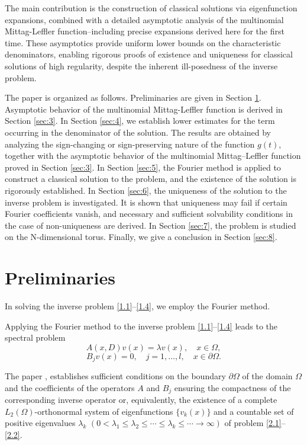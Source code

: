 \documentclass[12pt, reqno]{amsart}
\theoremstyle{definition}
\theoremstyle{remark}
\numberwithin{equation}{section}
\begin{document}
The main contribution is the construction of classical solutions via eigenfunction expansions, combined with a detailed asymptotic analysis of the multinomial Mittag-Leffler function--including precise expansions derived here for the first time. These asymptotics provide uniform lower bounds on the characteristic denominators, enabling rigorous proofs of existence and uniqueness for classical solutions of high regularity, despite the inherent ill-posedness of the inverse problem.

The paper is organized as follows. Preliminaries are given in Section \ref{sec:2}. Asymptotic behavior of the multinomial Mittag-Leffler function is derived in Section \ref{sec:3}. In Section \ref{sec:4}, we establish lower estimates for the term occurring in the denominator of the solution. The results are obtained by analyzing
the sign-changing or sign-preserving nature of the function $g(t)$, together with
the asymptotic behavior of the multinomial Mittag–Leffler function proved in
Section \ref{sec:3}. In Section \ref{sec:5}, the Fourier method is applied to construct a classical solution to the problem, and the existence of the solution is rigorously established. In Section \ref{sec:6}, the uniqueness of the solution to the inverse problem is investigated. It is shown that uniqueness may fail if certain Fourier coefficients vanish, and necessary and sufficient solvability conditions in the case of non-uniqueness are derived. In Section \ref{sec:7}, the problem is studied on the N-dimensional torus. Finally, we give a conclusion in Section \ref{sec:8}.

\section{Preliminaries}
\label{sec:2}
In solving the inverse problem \eqref{1.1}--\eqref{1.4}, we employ the Fourier method.

Applying the Fourier method to the inverse problem \eqref{1.1}--\eqref{1.4} leads to the spectral problem
\begin{equation}\label{2.1}
    A(x, D)v(x) = \lambda v(x), \quad x \in \Omega,
\end{equation}
\begin{equation}\label{2.2}
    B_j v(x) = 0, \quad j = 1, \dots, l, \quad x \in \partial \Omega.
\end{equation}

The paper \cite{19},\cite{20} establishes sufficient conditions on the boundary $\partial \Omega$ of the domain $\Omega$ 
and the coefficients of the operators $A$ and $B_j$ ensuring the compactness of the corresponding inverse operator 
or, equivalently, the existence of a complete $L_2(\Omega)$-orthonormal system of eigenfunctions $\{v_k(x)\}$ 
and a countable set of positive eigenvalues $\lambda_k$ $(0 < \lambda_1 \le \lambda_2 \le \cdots \le \lambda_k\le \cdots
\to\infty)$ of problem \eqref{2.1}--\eqref{2.2}.
\end{document}
